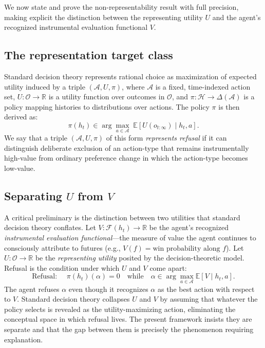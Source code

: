 \documentclass[11pt]{article}
\newcommand{\Hist}{\mathcal{H}}
\newcommand{\Act}{\mathcal{A}}
\begin{document}
We now state and prove the non-representability result with full precision,
making explicit the distinction between the representing utility $U$ and the
agent's recognized instrumental evaluation functional $V$.

\subsection{The representation target class}

Standard decision theory represents rational choice as maximization of expected
utility induced by a triple $(\Act, U, \pi)$, where $\Act$ is a fixed,
time-indexed action set, $U: \mathcal{O} \to \mathbb{R}$ is a utility function
over outcomes in $\mathcal{O}$, and $\pi: \Hist \to \Delta(\Act)$ is a policy
mapping histories to distributions over actions. The policy $\pi$ is then
derived as:
\[
\pi(h_t) \in \arg\max_{a\in \Act} \;\mathbb{E}[U(o_{t:\infty}) \mid h_t, a].
\]
We say that a triple $(\Act, U, \pi)$ of this form \emph{represents refusal} if
it can distinguish deliberate exclusion of an action-type that remains
instrumentally high-value from ordinary preference change in which the
action-type becomes low-value.

\subsection{Separating $U$ from $V$}

A critical preliminary is the distinction between two utilities that standard
decision theory conflates. Let $V: \mathcal{F}(h_t) \to \mathbb{R}$ be the
agent's recognized \emph{instrumental evaluation functional}---the measure of
value the agent continues to consciously attribute to futures (e.g., $V(f) =
\text{win probability along }f$). Let $U: \mathcal{O} \to \mathbb{R}$ be the
\emph{representing utility} posited by the decision-theoretic model. Refusal
is the condition under which $U$ and $V$ come apart:
\[
\text{Refusal: }\quad \pi(h_t)(\alpha) = 0 \quad\text{while}\quad
\alpha \in \arg\max_{a\in \Act} \mathbb{E}[V \mid h_t, a].
\]
The agent refuses $\alpha$ even though it recognizes $\alpha$ as the best
action with respect to $V$. Standard decision theory collapses $U$ and $V$ by
assuming that whatever the policy selects is revealed as the utility-maximizing
action, eliminating the conceptual space in which refusal lives. The present
framework insists they are separate and that the gap between them is precisely
the phenomenon requiring explanation.
\end{document}
